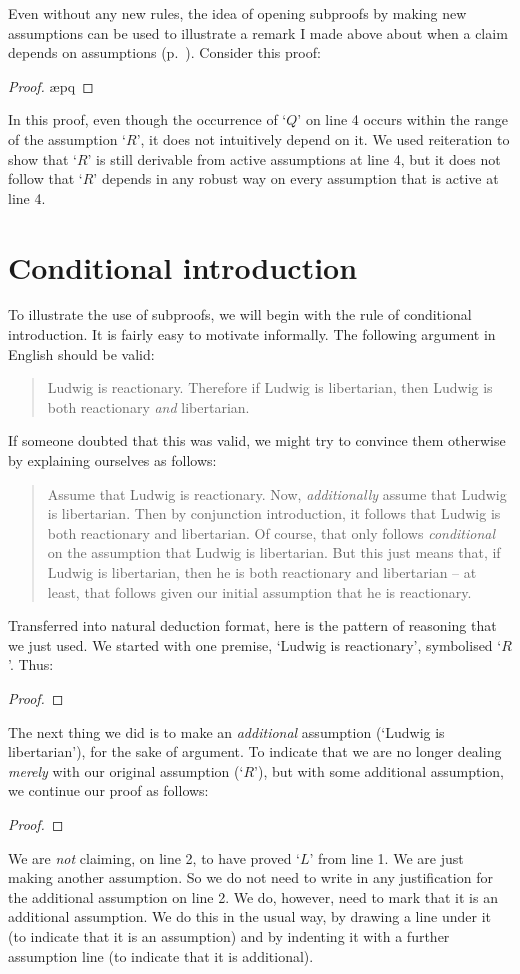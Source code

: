 Even without any new rules, the idea of opening subproofs by making new assumptions can be used to illustrate a remark I made above about when a claim depends on assumptions (p.\ \pageref{nondependence}). Consider this proof: \begin{proof}
	\ae{pq}
	\open {}
\end{proof} In this proof, even though the occurrence of `$Q$' on line 4 occurs within the range of the assumption `$R$', it does not intuitively depend on it. We used reiteration to show that `$R$' is still derivable from active assumptions at line 4, but it does not follow that `$R$' depends in any robust way on every assumption that is active at line 4. 

\section{Conditional introduction}\label{condint}

To illustrate the use of subproofs, we will begin with the rule of conditional introduction. It is fairly easy to motivate informally.\label{ci.motivate} The following argument in English should be valid:
	\begin{quote}
		Ludwig is reactionary. Therefore if Ludwig is libertarian, then Ludwig is both reactionary \emph{and} libertarian.
	\end{quote}
If someone doubted that this was valid, we might try to convince them otherwise by explaining ourselves as follows:
	\begin{quote}
		Assume that Ludwig is reactionary. Now, \emph{additionally} assume that Ludwig is libertarian. Then by conjunction introduction, it follows that Ludwig is both reactionary and libertarian. Of course, that only follows \emph{conditional} on the assumption that Ludwig is libertarian. But this just means that, if Ludwig is libertarian, then he is both reactionary and libertarian – at least, that follows given our initial assumption that he is reactionary.
	\end{quote}
Transferred into natural deduction format, here is the pattern of reasoning that we just used. We started with one premise, `Ludwig is reactionary', symbolised `$R$'. Thus:
	\begin{proof}
	\end{proof}
The next thing we did is to make an \emph{additional} assumption (`Ludwig is libertarian'), for the sake of argument. To indicate that we are no longer dealing \emph{merely} with our original assumption (`$R$'), but with some additional assumption, we continue our proof as follows:
	\begin{proof}
		\open
	\end{proof}
We are \emph{not} claiming, on line 2, to have proved `$L$' from line 1. We are just making another assumption. So we do not need to write in any justification for the additional assumption on line 2. We do, however, need to mark that it is an additional assumption. We do this in the usual way, by drawing a line under it (to indicate that it is an assumption) and by indenting it with a further assumption line (to indicate that it is additional). 

